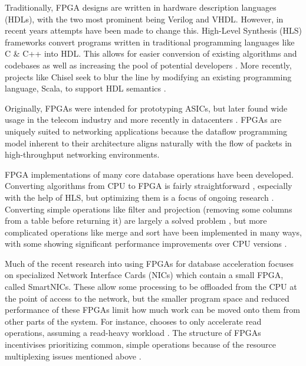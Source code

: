 Traditionally, FPGA designs are written in hardware description languages
(HDLs), with the two most prominent being Verilog and VHDL. However, in recent
years attempts have been made to change this. High-Level Synthesis (HLS)
frameworks convert programs written in traditional programming languages like C
\& C++ into HDL. This allows for easier conversion of existing algorithms and
codebases as well as increasing the pool of potential developers
\autocite{martin-destest-2009}. More recently, projects like Chisel seek to blur
the line by modifying an existing programming language, Scala, to support HDL
semantics \autocite{chisel}.

Originally, FPGAs were intended for prototyping ASICs, but later found wide
usage in the telecom industry \autocite{bobda-trets-2022,mencer-queue-2020} and
more recently in datacenters \autocite{mencer-queue-2020,hoozemans-cas-2021}.
FPGAs are uniquely suited to networking applications because the dataflow
programming model \autocite{hoozemans-cas-2021} inherent to their architecture
aligns naturally with the flow of packets in high-throughput networking
environments.


\label{sec:datacenter-fpga}

FPGA implementations of many core database operations have been developed.
Converting algorithms from CPU to FPGA is fairly straightforward
\autocite{fang-vldb-2020}, especially with the help of HLS, but optimizing them
is a focus of ongoing research \autocite{fang-vldb-2020}. Converting simple
operations like filter and projection (removing some columns from a table before
returning it) are largely a solved problem \autocite{fang-vldb-2020}, but more
complicated operations like merge and sort have been implemented in many ways,
with some showing significant performance improvements over CPU versions
\autocite{leggett-trets-2025,moghaddamfar-damon-2021}.

Much of the recent research into using FPGAs for database acceleration focuses
on specialized Network Interface Cards (NICs) which contain a small FPGA, called
SmartNICs. These allow some processing to be offloaded from the CPU at the point
of access to the network, but the smaller program space and reduced performance
of these FPGAs limit how much work can be moved onto them from other parts of
the system. For instance,  chooses to only accelerate read
operations, assuming a read-heavy workload \autocite{honeycomb}. The structure
of FPGAs incentivises prioritizing common, simple operations because of the
resource multiplexing issues mentioned above
\autocite{honeycomb,moghaddamfar-damon-2021}.

